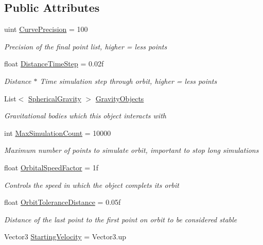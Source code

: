 \subsection*{Public Attributes}
\begin{DoxyCompactItemize}
\item 
uint \hyperlink{class_g_t_core_1_1_enviroment_1_1_satellite_movement_a4367ff0305eef42e5f23cdd3dcee1d6b}{Curve\+Precision} = 100
\begin{DoxyCompactList}\small\item\em Precision of the final point list, higher = less points \end{DoxyCompactList}\item 
float \hyperlink{class_g_t_core_1_1_enviroment_1_1_satellite_movement_a2bcfe4e72d44e5c6850f151bea94ff0d}{Distance\+Time\+Step} = 0.\+02f
\begin{DoxyCompactList}\small\item\em Distance $\ast$ Time simulation step through orbit, higher = less points \end{DoxyCompactList}\item 
List$<$ \hyperlink{class_g_t_core_1_1_enviroment_1_1_spherical_gravity}{Spherical\+Gravity} $>$ \hyperlink{class_g_t_core_1_1_enviroment_1_1_satellite_movement_a584e1245a9f119598f6fec5556612484}{Gravity\+Objects}
\begin{DoxyCompactList}\small\item\em Gravitational bodies which this object interacts with \end{DoxyCompactList}\item 
int \hyperlink{class_g_t_core_1_1_enviroment_1_1_satellite_movement_af7c8eb740e4d9802edadfa1d4c605f26}{Max\+Simulation\+Count} = 10000
\begin{DoxyCompactList}\small\item\em Maximum number of points to simulate orbit, important to stop long simulations \end{DoxyCompactList}\item 
float \hyperlink{class_g_t_core_1_1_enviroment_1_1_satellite_movement_a50b66bcd0969474ef47af91dcd129b72}{Orbital\+Speed\+Factor} = 1f
\begin{DoxyCompactList}\small\item\em Controls the speed in which the object complets its orbit \end{DoxyCompactList}\item 
float \hyperlink{class_g_t_core_1_1_enviroment_1_1_satellite_movement_a87d2eb7380cf22cc86c30e8812eabe28}{Orbit\+Tolerance\+Distance} = 0.\+05f
\begin{DoxyCompactList}\small\item\em Distance of the last point to the first point on orbit to be considered stable \end{DoxyCompactList}\item 
Vector3 \hyperlink{class_g_t_core_1_1_enviroment_1_1_satellite_movement_a40de5e52bf15f802fc963ff3ee3434bc}{Starting\+Velocity} = Vector3.\+up
\end{DoxyCompactItemize}


